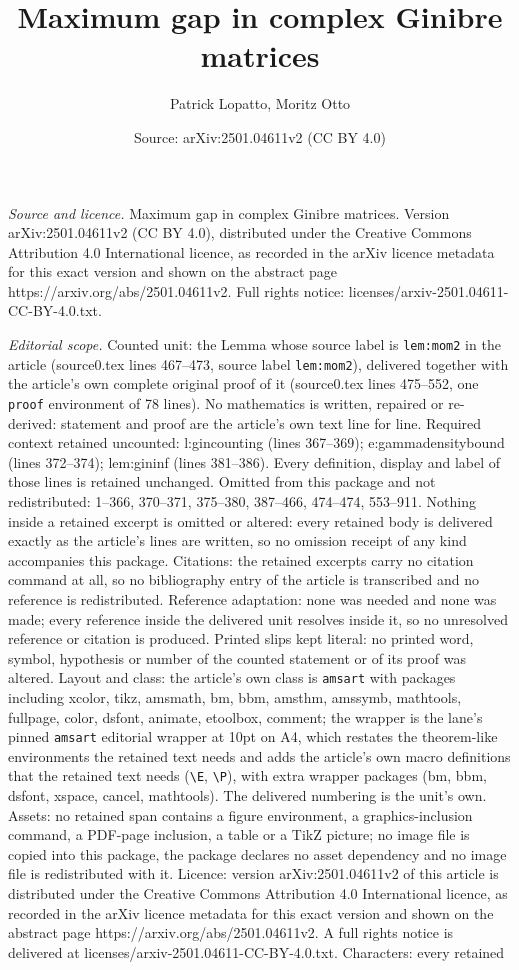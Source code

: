 \documentclass[10pt,a4paper]{amsart}
\title[Maximum gap in complex Ginibre matrices]{Maximum gap in complex Ginibre matrices}
\author{Patrick Lopatto, Moritz Otto}
\date{Source: arXiv:2501.04611v2 (CC BY 4.0)}
\begin{document}
\maketitle

\noindent\emph{Source and licence.} Maximum gap in complex Ginibre matrices. Version arXiv:2501.04611v2 (CC BY 4.0), distributed under the Creative Commons Attribution 4.0 International licence, as recorded in the arXiv licence metadata for this exact version and shown on the abstract page https://arxiv.org/abs/2501.04611v2. Full rights notice: licenses/arxiv-2501.04611-CC-BY-4.0.txt.\par\smallskip

\noindent\textit{Editorial scope.} Counted unit: the Lemma whose source label is \texttt{lem:mom2} in the article (source0.tex lines 467--473, source label \texttt{lem:mom2}), delivered together with the article's own complete original proof of it (source0.tex lines 475--552, one \texttt{proof} environment of 78 lines). No mathematics is written, repaired or re-derived: statement and proof are the article's own text line for line. Required context retained uncounted: l:gincounting (lines 367--369); e:gammadensitybound (lines 372--374); lem:gininf (lines 381--386). Every definition, display and label of those lines is retained unchanged. Omitted from this package and not redistributed: 1--366, 370--371, 375--380, 387--466, 474--474, 553--911. Nothing inside a retained excerpt is omitted or altered: every retained body is delivered exactly as the article's lines are written, so no omission receipt of any kind accompanies this package. Citations: the retained excerpts carry no citation command at all, so no bibliography entry of the article is transcribed and no reference is redistributed. Reference adaptation: none was needed and none was made; every reference inside the delivered unit resolves inside it, so no unresolved reference or citation is produced. Printed slips kept literal: no printed word, symbol, hypothesis or number of the counted statement or of its proof was altered. Layout and class: the article's own class is \texttt{amsart} with packages including xcolor, tikz, amsmath, bm, bbm, amsthm, amssymb, mathtools, fullpage, color, dsfont, animate, etoolbox, comment; the wrapper is the lane's pinned \texttt{amsart} editorial wrapper at 10pt on A4, which restates the theorem-like environments the retained text needs and adds the article's own macro definitions that the retained text needs (\texttt{\textbackslash E}, \texttt{\textbackslash P}), with extra wrapper packages (bm, bbm, dsfont, xspace, cancel, mathtools). The delivered numbering is the unit's own. Assets: no retained span contains a figure environment, a graphics-inclusion command, a PDF-page inclusion, a table or a TikZ picture; no image file is copied into this package, the package declares no asset dependency and no image file is redistributed with it. Licence: version arXiv:2501.04611v2 of this article is distributed under the Creative Commons Attribution 4.0 International licence, as recorded in the arXiv licence metadata for this exact version and shown on the abstract page https://arxiv.org/abs/2501.04611v2. A full rights notice is delivered at licenses/arxiv-2501.04611-CC-BY-4.0.txt. Characters: every retained 
\end{document}
